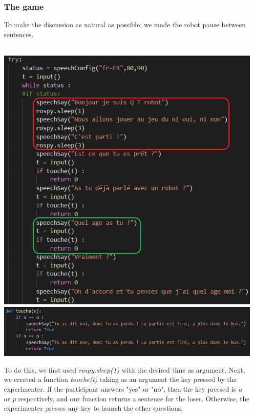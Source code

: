 \subsubsection{The game}
To make the discussion as natural as possible, we made the robot pause between sentences.\\
\\
\begin{minipage}{.6\textwidth}%
\includegraphics[width=\textwidth]{Figures/qtrobotscript3.2text.png}
\includegraphics[width=\textwidth]{Figures/qtrobotscript3text.png}
\end{minipage}%
\hfill
\begin{minipage}{.33\textwidth}%
 To do this, we first used \textit{rospy.sleep(1)} with the desired time as argument. Next, we created a function \textit{touche(t)} taking as an argument the key pressed by the experimenter.  If the participant answers "yes" or "no", then the key pressed is \textit{o} or \textit{p} respectively, and our function returns a sentence for the loser. Otherwise, the experimenter presses any key to launch the other questions.
\end{minipage}%
\noindent
